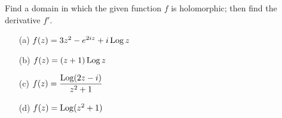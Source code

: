 \vspace{0.1in}

\begin{problem}\label{prob 9.5}
Find a domain in which the given function $f$ is holomorphic; then find the derivative $f'$.
\begin{itemize}
\item[(a)] $f(z) = 3z^2 - e^{2iz} + i\operatorname{Log} z$
\item[(b)] $f(z) = (z + 1)\operatorname{Log} z$
\item[(c)] $f(z) = \dfrac{\operatorname{Log}(2z-i)}{z^2 + 1}$
\item[(d)] $f(z) = \operatorname{Log}(z^2 + 1)$
\end{itemize}
\end{problem}